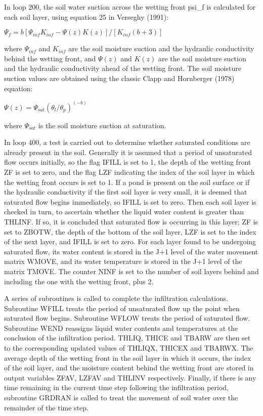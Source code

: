 In loop 200, the soil water suction across the wetting front psi\+\_\+f is calculated for each soil layer, using equation 25 in Verseghy (1991)\+:

$\Psi_f = b[\Psi_{inf} K_{inf} - \Psi(z) K(z)]/[K_{inf} (b+3)]$

where $\Psi_{inf}$ and $K_{inf}$ are the soil moisture suction and the hydraulic conductivity behind the wetting front, and $\Psi(z)$ and $K(z)$ are the soil moisture suction and the hydraulic conductivity ahead of the wetting front. The soil moisture suction values are obtained using the classic Clapp and Hornberger (1978) equation\+:

$\Psi(z) = \Psi_{sat} (\theta_l / \theta_p )^{(-b)}$

where $\Psi_{sat}$ is the soil moisture suction at saturation.

In loop 400, a test is carried out to determine whether saturated conditions are already present in the soil. Generally it is assumed that a period of unsaturated flow occurs initially, so the flag I\+F\+I\+L\+L is set to 1, the depth of the wetting front Z\+F is set to zero, and the flag L\+Z\+F indicating the index of the soil layer in which the wetting front occurs is set to 1. If a pond is present on the soil surface or if the hydraulic conductivity if the first soil layer is very small, it is deemed that saturated flow begins immediately, so I\+F\+I\+L\+L is set to zero. Then each soil layer is checked in turn, to ascertain whether the liquid water content is greater than T\+H\+L\+I\+N\+F. If so, it is concluded that saturated flow is occurring in this layer; Z\+F is set to Z\+B\+O\+T\+W, the depth of the bottom of the soil layer, L\+Z\+F is set to the index of the next layer, and I\+F\+I\+L\+L is set to zero. For each layer found to be undergoing saturated flow, its water content is stored in the J+1 level of the water movement matrix W\+M\+O\+V\+E, and its water temperature is stored in the J+1 level of the matrix T\+M\+O\+V\+E. The counter N\+I\+N\+F is set to the number of soil layers behind and including the one with the wetting front, plus 2.

A series of subroutines is called to complete the infiltration calculations. Subroutine W\+F\+I\+L\+L treats the period of unsaturated flow up the point when saturated flow begins. Subroutine W\+F\+L\+O\+W treats the period of saturated flow. Subroutine W\+E\+N\+D reassigns liquid water contents and temperatures at the conclusion of the infiltration period. T\+H\+L\+I\+Q, T\+H\+I\+C\+E and T\+B\+A\+R\+W are then set to the corresponding updated values of T\+H\+L\+I\+Q\+X, T\+H\+I\+C\+E\+X and T\+B\+A\+R\+W\+X. The average depth of the wetting front in the soil layer in which it occurs, the index of the soil layer, and the moisture content behind the wetting front are stored in output variables Z\+F\+A\+V, L\+Z\+F\+A\+V and T\+H\+L\+I\+N\+V respectively. Finally, if there is any time remaining in the current time step following the infiltration period, subroutine G\+R\+D\+R\+A\+N is called to treat the movement of soil water over the remainder of the time step.

